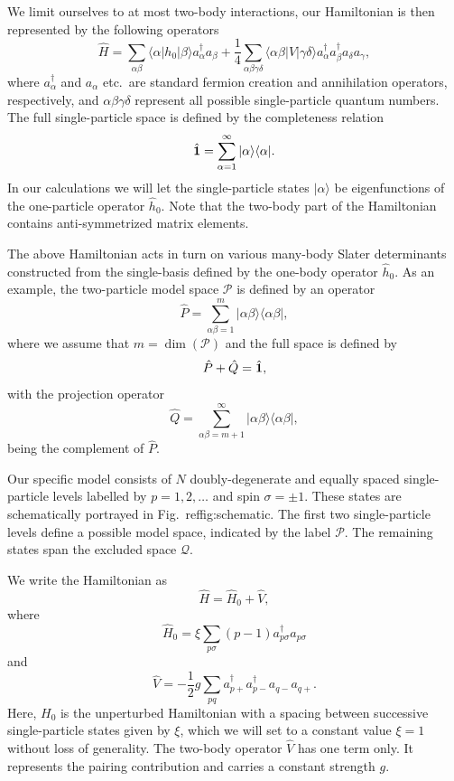 \documentclass[%
twoside,                 %
final,                   %
10pt]{article}
\begin{document}
We limit ourselves to at most two-body interactions, our Hamiltonian
is then represented by the following operators
\[
\hat{H} = \sum_{\alpha\beta}\langle \alpha |h_0|\beta\rangle
a_{\alpha}^{\dagger}a_{\beta}+\frac{1}{4}\sum_{\alpha\beta\gamma\delta}\langle \alpha\beta|
V|\gamma\delta\rangle a_{\alpha}^{\dagger}a_{\beta}^{\dagger}a_{\delta}a_{\gamma},
\]
where $a_{\alpha}^{\dagger}$ and $a_{\alpha}$ etc.~are standard
fermion creation and annihilation operators, respectively, and
$\alpha\beta\gamma\delta$ represent all possible single-particle
quantum numbers.  The full single-particle space is defined by the
completeness relation 
\[
\hat{{\bf 1}} = \sum_{\alpha=1}^{\infty}|\alpha \rangle \langle \alpha|.
\]
In our calculations
we will let the single-particle states $|\alpha\rangle$ be
eigenfunctions of the one-particle operator $\hat{h}_0$. Note that the two-body part of the Hamiltonian 
contains anti-symmetrized matrix elements.


The above Hamiltonian acts in turn on various many-body Slater
determinants constructed from the single-basis defined by the one-body
operator $\hat{h}_0$.  As an example, the two-particle model space
$\mathcal{P}$ is defined by an operator
\[
\hat{P} = \sum_{\alpha\beta =1}^{m}|\alpha\beta \rangle \langle
\alpha\beta|,
\]
where we assume that $m=\dim(\mathcal{P})$ and the full space is
defined by
\[
\hat{P}+\hat{Q}=\hat{{\bf 1}},
\]
with the projection operator
\[
\hat{Q} = \sum_{\alpha\beta =m+1}^{\infty}|\alpha\beta \rangle \langle
\alpha\beta|,
\]
being the complement of $\hat{P}$.


Our specific model consists of $N$ doubly-degenerate and equally
spaced single-particle levels labelled by $p=1,2,\dots$ and spin
$\sigma=\pm 1$.  These states are schematically portrayed in
Fig.~ref{fig:schematic}.  The first two single-particle levels define
a possible model space, indicated by the label $\mathcal{P}$.  The
remaining states span the excluded space $\mathcal{Q}$.

We write the Hamiltonian as
\[ \hat{H} = \hat{H}_0 + \hat{V} , \]
where
\[
\hat{H}_0=\xi\sum_{p\sigma}(p-1)a_{p\sigma}^{\dagger}a_{p\sigma}
\]
and
\[
\hat{V}=-\frac{1}{2}g\sum_{pq}a^{\dagger}_{p+}
a^{\dagger}_{p-}a_{q-}a_{q+}.
\]
Here, $H_0$ is the unperturbed Hamiltonian with a spacing between
successive single-particle states given by $\xi$, which we will set to
a constant value $\xi=1$ without loss of generality. The two-body
operator $\hat{V}$ has one term only. It represents the pairing
contribution and carries a constant strength $g$.
\end{document}
